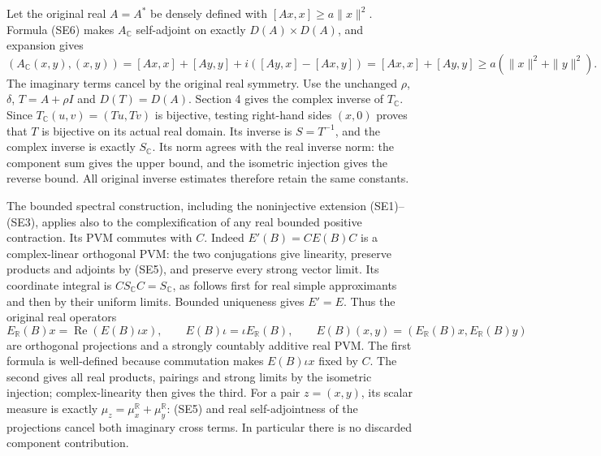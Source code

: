 \documentclass[
  11pt,
]{article}
\begin{document}
Let the original real \(A=A^*\) be densely defined with
\([Ax,x]\geq a\|x\|^2\). Formula (SE6) makes \(A_{\mathbb C}\)
self-adjoint on exactly \(D(A)\times D(A)\), and expansion gives \[
 (A_{\mathbb C}(x,y),(x,y))
 =[Ax,x]+[Ay,y]+i([Ay,x]-[Ax,y])
 =[Ax,x]+[Ay,y]\geq a(\|x\|^2+\|y\|^2).
 \tag{SE7}
\] The imaginary terms cancel by the original real symmetry. Use the
unchanged \(\rho\), \(\delta\), \(T=A+\rho I\) and \(D(T)=D(A)\).
Section 4 gives the complex inverse of \(T_{\mathbb C}\). Since
\(T_{\mathbb C}(u,v)=(Tu,Tv)\) is bijective, testing right-hand sides
\((x,0)\) proves that \(T\) is bijective on its actual real domain. Its
inverse is \(S=T^{-1}\), and the complex inverse is exactly
\(S_{\mathbb C}\). Its norm agrees with the real inverse norm: the
component sum gives the upper bound, and the isometric injection gives
the reverse bound. All original inverse estimates therefore retain the
same constants.

The bounded spectral construction, including the noninjective extension
(SE1)--(SE3), applies also to the complexification of any real bounded
positive contraction. Its PVM commutes with \(C\). Indeed
\(E'(B)=CE(B)C\) is a complex-linear orthogonal PVM: the two
conjugations give linearity, preserve products and adjoints by (SE5),
and preserve every strong vector limit. Its coordinate integral is
\(CS_{\mathbb C}C=S_{\mathbb C}\), as follows first for real simple
approximants and then by their uniform limits. Bounded uniqueness gives
\(E'=E\). Thus the original real operators \[
 E_{\mathbb R}(B)x=\operatorname{Re}(E(B)\iota x),\qquad
 E(B)\iota=\iota E_{\mathbb R}(B),\qquad
 E(B)(x,y)=(E_{\mathbb R}(B)x,E_{\mathbb R}(B)y)
 \tag{SE8}
\] are orthogonal projections and a strongly countably additive real
PVM. The first formula is well-defined because commutation makes
\(E(B)\iota x\) fixed by \(C\). The second gives all real products,
pairings and strong limits by the isometric injection; complex-linearity
then gives the third. For a pair \(z=(x,y)\), its scalar measure is
exactly \(\mu_z=\mu_x^{\mathbb R}+\mu_y^{\mathbb R}\): (SE5) and real
self-adjointness of the projections cancel both imaginary cross terms.
In particular there is no discarded component contribution.
\end{document}
